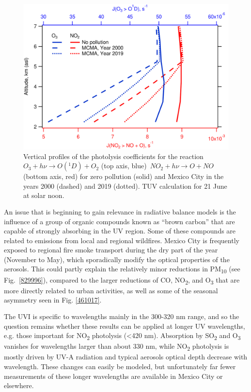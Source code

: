 \documentclass[journal=jacsat,manuscript=article]{achemso}
\begin{document}
\begin{figure}[H]
  \begin{center}
    \includegraphics[width=0.70\columnwidth]{figures/jvals}
    \caption{{Vertical profiles of the photolysis coefficients for the
          reaction~\(O_3 + h\nu \rightarrow O(^1D) + O_2\) (top axis, blue)~\(NO_2 + h\nu \rightarrow O+NO \) (bottom
          axis, red) for zero pollution (solid) and Mexico City in the years 2000
          (dashed) and 2019 (dotted). TUV calculation for 21 June at solar noon.
            {\label{973680}}%
        }}
  \end{center}
\end{figure}

An issue that is beginning to gain relevance in radiative balance models
is the influence of a group of organic compounds known as “brown carbon” that are
capable of strongly absorbing in the UV region.\citep{Laskin_2015} Some of
these compounds are related to emissions from local and regional
wildfires.\citep{Gadhavi_2010} Mexico City is frequently exposed to
regional fire smoke transport during the dry part of the year (November
to May)\citep{Rios_2019}, which sporadically modify the optical
properties of the aerosols.\citep{Barnard_2008} This could partly explain
the relatively minor reductions in PM\textsubscript{10} (see
Fig.~{\ref{829996}}), compared to the larger reductions
of CO, NO\textsubscript{2}, and O\textsubscript{3} that are more
directly related to urban activities, as well as some of the seasonal
asymmetry seen in Fig. {\ref{461017}}. ~

The UVI is specific to wavelengths mainly in the 300-320 nm range, and
so the question remains whether these results can be applied at longer
UV wavelengths, e.g. those important for NO\textsubscript{2} photolysis
(\textless{}420 nm). Absorption by SO\textsubscript{2} and
O\textsubscript{3} vanishes for wavelengths larger than about 330 nm,
while NO\textsubscript{2} photolysis is mostly driven by UV-A radiation
and typical aerosols optical depth decrease with wavelength. These changes can
easily be modeled, but unfortunately far fewer measurements of these
longer wavelengths are available in Mexico City or elsewhere.
\end{document}
